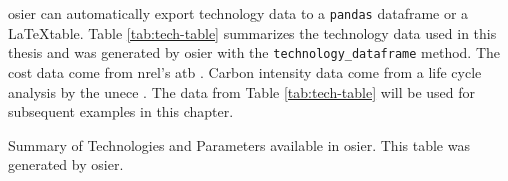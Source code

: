 \ac{osier} can automatically export technology data to a \texttt{pandas}
dataframe or a \LaTeX table. Table \ref{tab:tech-table} summarizes the
technology data used in this thesis and was generated by \ac{osier} with the
\texttt{technology\_dataframe} method. The cost data come from \ac{nrel}'s
\ac{atb} \cite{national_renewable_energy_laboratory_2023_2023}. Carbon intensity
data come from a life cycle analysis by the \ac{unece}
\cite{united_nations_economic_commission_for_europe_carbon_2022}. The data from
Table \ref{tab:tech-table} will be used for subsequent examples in this chapter.

\begin{sidewaystable}[!ht]
  \centering
  \caption{Summary of Technologies and Parameters available in \ac{osier}. This
  table was generated by \ac{osier}.}
  \label{tab:tech-table}
  \resizebox{\textheight}{!}{
  
  } %
\end{sidewaystable}

\FloatBarrier